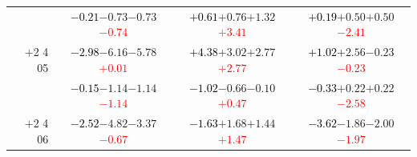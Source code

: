 \documentclass[compress]{beamer}
\begin{document}
\begin{frame}
\begin{tabular}{r | c | c | c}
          & \textcolor{black}{$-0.21$}\hspace{0.1 cm}$-0.73$\hspace{0.1 cm}$-0.73$\hspace{0.1 cm}\textcolor{red}{$-0.74$} & \textcolor{black}{$+0.61$}\hspace{0.1 cm}$+0.76$\hspace{0.1 cm}$+1.32$\hspace{0.1 cm}\textcolor{red}{$+3.41$} & \textcolor{black}{$+0.19$}\hspace{0.1 cm}$+0.50$\hspace{0.1 cm}$+0.50$\hspace{0.1 cm}\textcolor{red}{$-2.41$} \\
$+$2 4 05 & \textcolor{black}{$-2.98$}\hspace{0.1 cm}$-6.16$\hspace{0.1 cm}$-5.78$\hspace{0.1 cm}\textcolor{red}{$+0.01$} & \textcolor{black}{$+4.38$}\hspace{0.1 cm}$+3.02$\hspace{0.1 cm}$+2.77$\hspace{0.1 cm}\textcolor{red}{$+2.77$} & \textcolor{black}{$+1.02$}\hspace{0.1 cm}$+2.56$\hspace{0.1 cm}$-0.23$\hspace{0.1 cm}\textcolor{red}{$-0.23$} \\
          & \textcolor{black}{$-0.15$}\hspace{0.1 cm}$-1.14$\hspace{0.1 cm}$-1.14$\hspace{0.1 cm}\textcolor{red}{$-1.14$} & \textcolor{black}{$-1.02$}\hspace{0.1 cm}$-0.66$\hspace{0.1 cm}$-0.10$\hspace{0.1 cm}\textcolor{red}{$+0.47$} & \textcolor{black}{$-0.33$}\hspace{0.1 cm}$+0.22$\hspace{0.1 cm}$+0.22$\hspace{0.1 cm}\textcolor{red}{$-2.58$} \\
$+$2 4 06 & \textcolor{black}{$-2.52$}\hspace{0.1 cm}$-4.82$\hspace{0.1 cm}$-3.37$\hspace{0.1 cm}\textcolor{red}{$-0.67$} & \textcolor{black}{$-1.63$}\hspace{0.1 cm}$+1.68$\hspace{0.1 cm}$+1.44$\hspace{0.1 cm}\textcolor{red}{$+1.47$} & \textcolor{black}{$-3.62$}\hspace{0.1 cm}$-1.86$\hspace{0.1 cm}$-2.00$\hspace{0.1 cm}\textcolor{red}{$-1.97$} \\

\end{tabular}
\end{frame}
\end{document}
